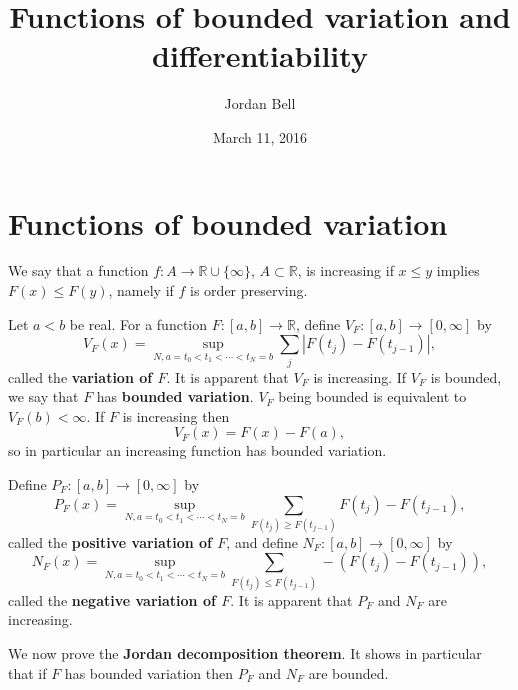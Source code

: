 \documentclass{article}
\theoremstyle{definition}
\begin{document}
\title{Functions of bounded variation and differentiability}
\author{Jordan Bell}
\date{March 11, 2016}

\maketitle

\section{Functions of bounded variation}
We say that a function $f:A \to \mathbb{R} \cup \{\infty\}$, $A \subset \mathbb{R}$,
is 
increasing if $x \leq y$ implies $F(x) \leq F(y)$, namely if $f$ is order preserving. 

Let $a<b$ be real. For a function $F:[a,b] \to \mathbb{R}$, define $V_F:[a,b] \to [0,\infty]$ by
\[
V_F(x) = \sup_{N, a=t_0<t_1<\cdots<t_N=b} \sum_j |F(t_j)-F(t_{j-1})|,
\]
called the \textbf{variation of $F$}.
It is apparent that $V_F$ is increasing. If $V_F$ is bounded, we say that $F$ has \textbf{bounded variation}.  $V_F$
being bounded is equivalent to $V_F(b)<\infty$. If $F$ is increasing then
\[
V_F(x) = F(x)-F(a),
\]
so in particular an increasing function has bounded variation.


Define $P_F:[a,b] \to [0,\infty]$ by
\[
P_F(x) = \sup_{N, a=t_0<t_1<\cdots<t_N=b} \sum_{F(t_j) \geq F(t_{j-1})} F(t_j)-F(t_{j-1}),
\]
called the \textbf{positive variation of $F$}, and define
$N_F:[a,b] \to [0,\infty]$ by
\[
N_F(x) = \sup_{N, a=t_0<t_1<\cdots<t_N=b} \sum_{F(t_j) \leq F(t_{j-1})} -(F(t_j)-F(t_{j-1})),
\]
called the \textbf{negative variation of $F$}. It is apparent that $P_F$ and $N_F$ are increasing.

We now prove the \textbf{Jordan decomposition theorem}. It shows in particular that if $F$ has bounded variation then
$P_F$ and $N_F$ are bounded.
\end{document}
